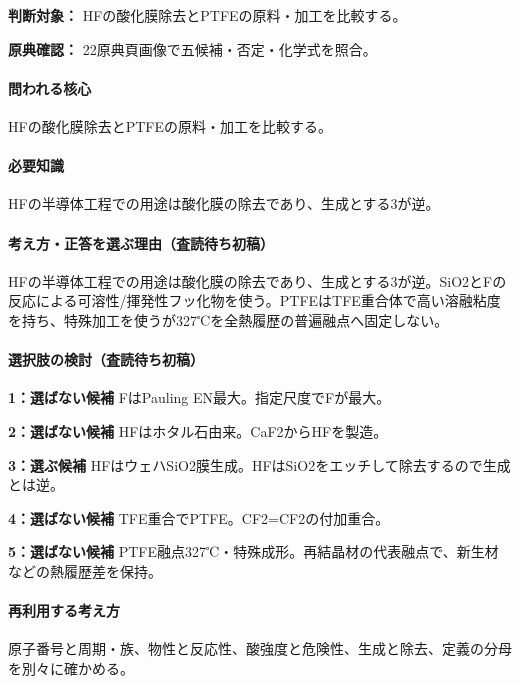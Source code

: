 \noindent\textbf{判断対象：} HFの酸化膜除去とPTFEの原料・加工を比較する。\par

\noindent\textbf{原典確認：} 22原典頁画像で五候補・否定・化学式を照合。\par

\paragraph{問われる核心} HFの酸化膜除去とPTFEの原料・加工を比較する。

\paragraph{必要知識} HFの半導体工程での用途は酸化膜の除去であり、生成とする3が逆。

\paragraph{考え方・正答を選ぶ理由（査読待ち初稿）} HFの半導体工程での用途は酸化膜の除去であり、生成とする3が逆。SiO2とFの反応による可溶性/揮発性フッ化物を使う。PTFEはTFE重合体で高い溶融粘度を持ち、特殊加工を使うが327℃を全熱履歴の普遍融点へ固定しない。

\paragraph{選択肢の検討（査読待ち初稿）}\mbox{}\par

\noindent\textbf{1：選ばない候補} FはPauling EN最大。指定尺度でFが最大。\par

\noindent\textbf{2：選ばない候補} HFはホタル石由来。CaF2からHFを製造。\par

\noindent\textbf{3：選ぶ候補} HFはウェハSiO2膜生成。HFはSiO2をエッチして除去するので生成とは逆。\par

\noindent\textbf{4：選ばない候補} TFE重合でPTFE。CF2=\allowbreak{}CF2の付加重合。\par

\noindent\textbf{5：選ばない候補} PTFE融点327℃・特殊成形。再結晶材の代表融点で、新生材などの熱履歴差を保持。\par

\paragraph{再利用する考え方} 原子番号と周期・族、物性と反応性、酸強度と危険性、生成と除去、定義の分母を別々に確かめる。

